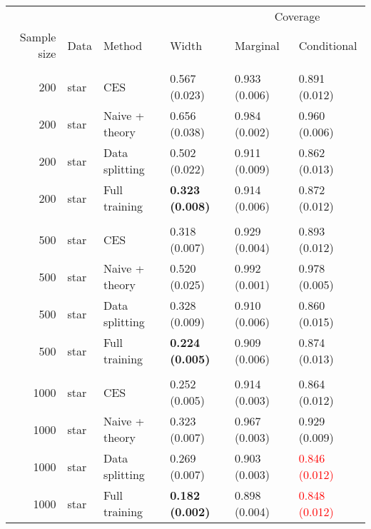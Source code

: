 
\begin{tabular}[t]{rlllll}
\toprule
\multicolumn{4}{c}{ } & \multicolumn{2}{c}{Coverage} \\
\cmidrule(l{3pt}r{3pt}){5-6}
Sample size & Data & Method & Width & Marginal & Conditional\\
\midrule
\addlinespace[0.3em]
\multicolumn{6}{l}{\textbf{200}}\\
\hspace{1em}200 & star & CES & 0.567 (0.023) & 0.933 (0.006) & 0.891 (0.012)\\
\hspace{1em}200 & star & Naive + theory & 0.656 (0.038) & 0.984 (0.002) & 0.960 (0.006)\\
\hspace{1em}200 & star & Data splitting & 0.502 (0.022) & 0.911 (0.009) & 0.862 (0.013)\\
\hspace{1em}200 & star & Full training & \textbf{0.323 (0.008)} & 0.914 (0.006) & 0.872 (0.012)\\
\addlinespace[0.3em]
\multicolumn{6}{l}{\textbf{500}}\\
\hspace{1em}500 & star & CES & 0.318 (0.007) & 0.929 (0.004) & 0.893 (0.012)\\
\hspace{1em}500 & star & Naive + theory & 0.520 (0.025) & 0.992 (0.001) & 0.978 (0.005)\\
\hspace{1em}500 & star & Data splitting & 0.328 (0.009) & 0.910 (0.006) & 0.860 (0.015)\\
\hspace{1em}500 & star & Full training & \textbf{0.224 (0.005)} & 0.909 (0.006) & 0.874 (0.013)\\
\addlinespace[0.3em]
\multicolumn{6}{l}{\textbf{1000}}\\
\hspace{1em}1000 & star & CES & 0.252 (0.005) & 0.914 (0.003) & 0.864 (0.012)\\
\hspace{1em}1000 & star & Naive + theory & 0.323 (0.007) & 0.967 (0.003) & 0.929 (0.009)\\
\hspace{1em}1000 & star & Data splitting & 0.269 (0.007) & 0.903 (0.003) & \textcolor{red}{0.846 (0.012)}\\
\hspace{1em}1000 & star & Full training & \textbf{0.182 (0.002)} & 0.898 (0.004) & \textcolor{red}{0.848 (0.012)}\\

\end{tabular}
